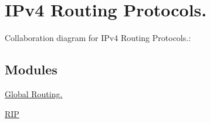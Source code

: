 \hypertarget{group__ipv4Routing}{}\section{I\+Pv4 Routing Protocols.}
\label{group__ipv4Routing}
Collaboration diagram for I\+Pv4 Routing Protocols.\+:
\subsection*{Modules}
\begin{DoxyCompactItemize}
\item 
\hyperlink{group__globalrouting}{Global Routing.}
\item 
\hyperlink{group__rip}{R\+IP}
\end{DoxyCompactItemize}
